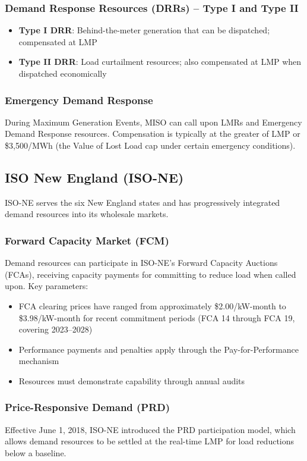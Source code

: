 \documentclass[12pt]{article}
\begin{document}
\subsubsection{Demand Response Resources (DRRs) -- Type I and Type II}
\begin{itemize}
    \item \textbf{Type I DRR}: Behind-the-meter generation that can be dispatched; compensated at LMP
    \item \textbf{Type II DRR}: Load curtailment resources; also compensated at LMP when dispatched economically
\end{itemize}

\subsubsection{Emergency Demand Response}
During Maximum Generation Events, MISO can call upon LMRs and Emergency Demand Response resources. Compensation is typically at the greater of LMP or \$3,500/MWh (the Value of Lost Load cap under certain emergency conditions).

\subsection{ISO New England (ISO-NE)}

ISO-NE serves the six New England states and has progressively integrated demand resources into its wholesale markets.

\subsubsection{Forward Capacity Market (FCM)}
Demand resources can participate in ISO-NE's Forward Capacity Auctions (FCAs), receiving capacity payments for committing to reduce load when called upon. Key parameters:
\begin{itemize}
    \item FCA clearing prices have ranged from approximately \$2.00/kW-month to \$3.98/kW-month for recent commitment periods (FCA 14 through FCA 19, covering 2023--2028)
    \item Performance payments and penalties apply through the Pay-for-Performance mechanism
    \item Resources must demonstrate capability through annual audits
\end{itemize}

\subsubsection{Price-Responsive Demand (PRD)}
Effective June 1, 2018, ISO-NE introduced the PRD participation model, which allows demand resources to be settled at the real-time LMP for load reductions below a baseline.
\end{document}
